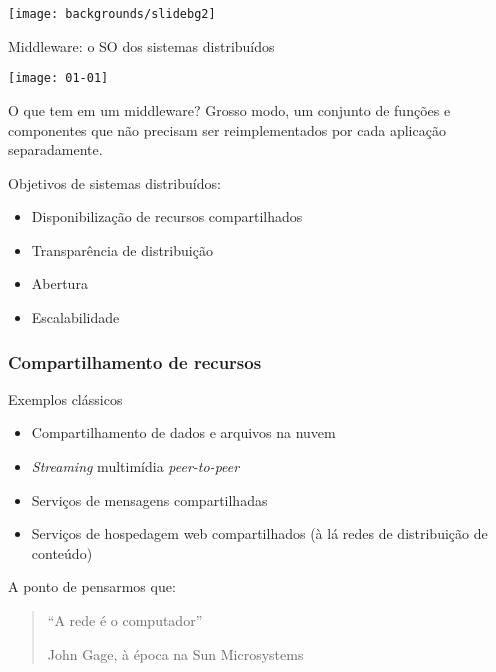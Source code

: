 \documentclass[Ligatures=TeX,table,brazil,svgnames,usetotalslideindicator,compress,10pt]{beamer}
\newcommand{\setsectionbg}{
    \setbeamertemplate{background}
     {\texttt{[image: backgrounds/slidebg2]}}
}
\begin{document}
\setsectionbg

\begin{frame}{Middleware: o SO dos sistemas distribuídos}

  \texttt{[image: 01-01]}

  \begin{block}{O que tem em um middleware?}
    Grosso modo, um conjunto de funções e componentes que não precisam ser reimplementados por cada aplicação separadamente.
  \end{block}

\end{frame}

\begin{frame}{Objetivos de sistemas distribuídos:}

  \begin{itemize}

  \item Disponibilização de recursos compartilhados
  \item Transparência de distribuição
  \item Abertura
  \item Escalabilidade

  \end{itemize}

\end{frame}

\begin{frame}
  \frametitle{Compartilhamento de recursos}
  \begin{exampleblock}{Exemplos clássicos}
    \begin{itemize}
    \item Compartilhamento de dados e arquivos na nuvem
    \item \textit{Streaming} multimídia \textit{peer-to-peer}
    \item Serviços de mensagens compartilhadas
    \item Serviços de hospedagem web compartilhados (à lá redes de distribuição de conteúdo)
    \end{itemize}
  \end{exampleblock}

  \begin{block}{A ponto de pensarmos que:}
  \begin{quotation}
    ``A rede é o computador''
    \begin{flushright}
      \small John Gage, à época na Sun Microsystems
    \end{flushright}
  \end{quotation}
\end{block}
\end{frame}
\end{document}
